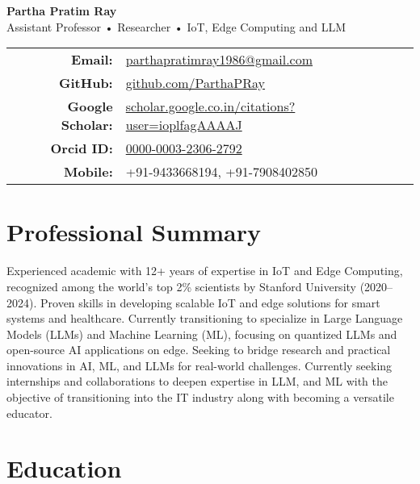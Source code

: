 \documentclass[10pt,a4paper]{article}
\begin{document}
	
	\begin{center}
		{\LARGE \textbf{Partha Pratim Ray}}\\
		\vspace{1mm}
		Assistant Professor • Researcher • IoT, Edge Computing and LLM\\
		\vspace{1mm}
		\begin{tabular}{rl}
			\textbf{Email:} & \href{mailto:parthapratimray1986@gmail.com}{parthapratimray1986@gmail.com} \\
			\textbf{GitHub:} & \href{https://github.com/ParthaPRay}{github.com/ParthaPRay} \\
			\textbf{Google Scholar:} & \href{https://scholar.google.co.in/citations?user=ioplfagAAAAJ&hl=en&oi=ao}{scholar.google.co.in/citations?user=ioplfagAAAAJ} \\
			\textbf{Orcid ID:} & \href{http://orcid.org/0000-0003-2306-2792}{0000-0003-2306-2792} \\
			\textbf{Mobile:} & +91-9433668194, +91-7908402850 \\
		\end{tabular}
	\end{center}
	
	\section*{Professional Summary}
	
	Experienced academic with 12+ years of expertise in IoT and Edge Computing, recognized among the world’s top 2\% scientists by Stanford University (2020–2024). Proven skills in developing scalable IoT and edge solutions for smart systems and healthcare. Currently transitioning to specialize in Large Language Models (LLMs) and Machine Learning (ML), focusing on quantized LLMs and open-source AI applications on edge. Seeking to bridge research and practical innovations in AI, ML, and LLMs for real-world challenges. Currently seeking internships and collaborations to deepen expertise in LLM, and ML with the objective of transitioning into the IT industry along with becoming a versatile educator.
	
	
	\section*{Education}
	
\end{document}
